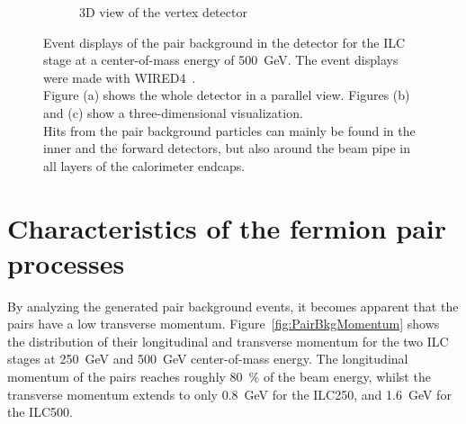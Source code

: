\begin{figure}[h]
\begin{subfigure}[b]{0.49\textwidth}
   \caption{3D view of the vertex detector}
   \end{subfigure}
   \caption[Pair background event displays]{Event displays of the pair background in the 
   \sid detector for the ILC stage at a center-of-mass energy of \SI[detect-all]{500}{\GeV}. 
   The event displays were made with WIRED4~\cite{Wired4}.
   \\Figure (a) shows the whole \sid detector in a parallel view.
   Figures (b) and (c) show a three-dimensional visualization.
   \\Hits from the pair background particles can mainly be found in the inner and the forward detectors, but also around the beam pipe in all layers of the calorimeter endcaps.
   }
   \label{fig:PairBkg:wired4}
 \end{figure}

\section{Characteristics of the fermion pair processes}
\label{PairBkg:helix}
By analyzing the generated pair background events, it becomes apparent that the \positron\electron pairs have a low transverse momentum.
Figure~\ref{fig:PairBkgMomentum} shows the distribution of their longitudinal and transverse momentum for the two ILC stages at \SI{250}{\GeV} and \SI{500}{\GeV} center-of-mass energy.
The longitudinal momentum of the \positron\electron pairs reaches roughly \SI{80}{\percent} of the beam energy, whilst the transverse momentum extends to only \SI{0.8}{\GeV} for the ILC250, and \SI{1.6}{\GeV} for the ILC500.
